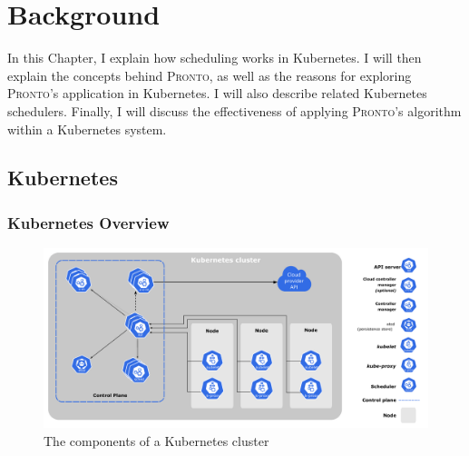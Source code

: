 \chapter{Background}

%
%

In this Chapter, I explain how scheduling works in Kubernetes. I will then
explain the concepts behind \textsc{Pronto}, as well as the reasons for exploring
\textsc{Pronto}'s application in Kubernetes. I will also describe related Kubernetes
schedulers. Finally, I will discuss the effectiveness of applying \textsc{Pronto}'s
algorithm within a Kubernetes system.

\section{Kubernetes}

\subsection{Kubernetes Overview}

\begin{figure}[H]
    \centering
    \includegraphics[width=\textwidth]{images/components-of-kubernetes.pdf}
    \caption{The components of a Kubernetes cluster
    \cite{kubernetes-components}}
    \label{kube-components}
\end{figure}

